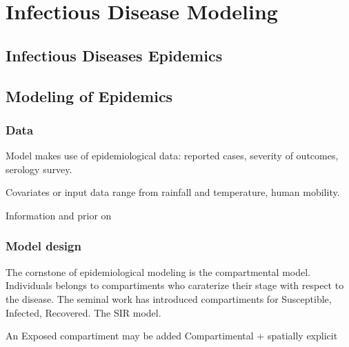 \chapter{Infectious Disease Modeling} %

\section{Infectious Diseases Epidemics} %


\section{Modeling of Epidemics}

\subsection{Data}
Model makes use of epidemiological data: reported cases, severity of outcomes, serology survey. 

Covariates or input data range from rainfall and temperature, human mobility.

Information and prior on



\subsection{Model design}
The cornstone of epidemiological modeling is the compartmental model. Individuals belongs to compartiments who caraterize their stage with respect to the disease. The seminal work has introduced compartiments for Susceptible, Infected, Recovered. The SIR model. 

An Exposed compartiment may be added 
Compartimental + spatially explicit
